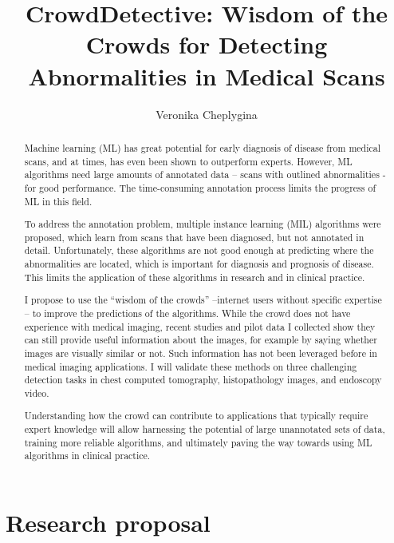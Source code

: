 \documentclass[serif, twocolumn, numeric, rga]{jote-article}
\title{CrowdDetective: Wisdom of the Crowds for Detecting Abnormalities in Medical Scans}
\author[1]{Veronika Cheplygina}%
\affil[1]{Medical Image Analysis, Department of Biomedical Engineering, Eindhoven University of Technology, Eindhoven, 5612 AZ, the Netherlands}
\begin{document}
\setcounter{page}{59}
\begin{frontmatter}
\maketitle 
\begin{abstract}
Machine learning (ML) has great potential for early diagnosis of disease from medical scans, and at times, has even been shown to outperform experts. However, ML algorithms need large amounts of annotated data -- scans with outlined abnormalities - for good performance. The time-consuming annotation process limits the progress of ML in this field.

To address the annotation problem, multiple instance learning (MIL) algorithms were proposed, which learn from scans that have been diagnosed, but not annotated in detail. Unfortunately, these algorithms are not good enough at predicting where the abnormalities are located, which is important for diagnosis and prognosis of disease. This limits the application of these algorithms in research and in clinical practice.

I propose to use the ``wisdom of the crowds'' --internet users without specific expertise -- to improve the predictions of the algorithms.
While the crowd does not have experience with medical imaging, recent studies and pilot data I collected show they can still provide useful information about the images, for example by saying whether images are visually similar or not. Such information has not been leveraged before in medical imaging applications. I will validate these methods on three challenging detection tasks in chest computed tomography, histopathology images, and endoscopy video.

Understanding how the crowd can contribute to applications that typically require expert knowledge will allow harnessing the potential of large unannotated sets of data, training more reliable algorithms, and ultimately paving the way towards using ML algorithms in clinical practice.
\end{abstract}
\end{frontmatter}

\section*{Research proposal}
\vspace{\baselineskip}
\end{document}

